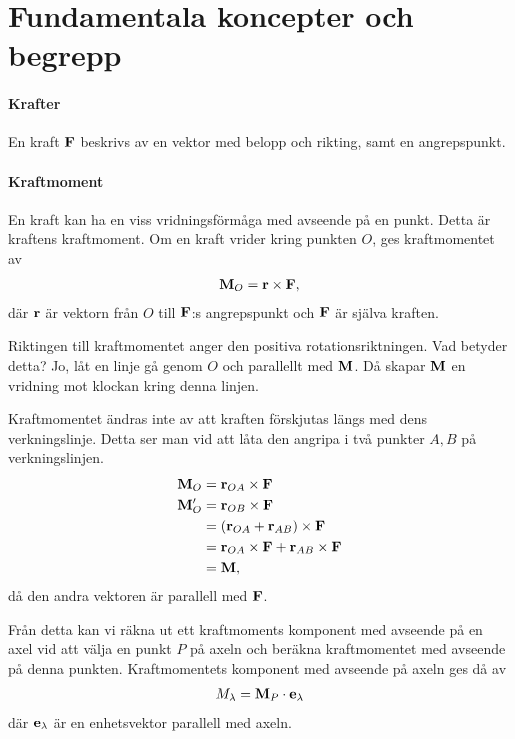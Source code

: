 \section{Fundamentala koncepter och begrepp}

\paragraph{Krafter}
En kraft $\vect{F}$ beskrivs av en vektor med belopp och rikting, samt en angrepspunkt.

\paragraph{Kraftmoment}
En kraft kan ha en viss vridningsförmåga med avseende på en punkt. Detta är kraftens kraftmoment. Om en kraft vrider kring punkten $O$, ges kraftmomentet av
\begin{align*}
	\vect{M}_O = \vect{r}\times\vect{F},
\end{align*}
där $\vect{r}$ är vektorn från $O$ till $\vect{F}$:s angrepspunkt och $\vect{F}$ är själva kraften.

Riktingen till kraftmomentet anger den positiva rotationsriktningen. Vad betyder detta? Jo, låt en linje gå genom $O$ och parallellt med $\vect{M}$. Då skapar $\vect{M}$ en vridning mot klockan kring denna linjen.

Kraftmomentet ändras inte av att kraften förskjutas längs med dens verkningslinje. Detta ser man vid att låta den angripa i två punkter $A, B$ på verkningslinjen.
\begin{align*}
	\vect{M}_O  &= \vect{r}_{OA}\times\vect{F} \\
	\vect{M}'_O &= \vect{r}_{OB}\times\vect{F} \\
	            &= (\vect{r}_{OA} + \vect{r}_{AB})\times\vect{F} \\
	            &= \vect{r}_{OA}\times\vect{F} + \vect{r}_{AB}\times\vect{F}\\
	            &= \vect{M},
\end{align*}
då den andra vektoren är parallell med $\vect{F}$.

Från detta kan vi räkna ut ett kraftmoments komponent med avseende på en axel vid att välja en punkt $P$ på axeln och beräkna kraftmomentet med avseende på denna punkten. Kraftmomentets komponent med avseende på axeln ges då av
\begin{align*}
	M_\lambda = \vect{M}_P\cdot\vect{e}_\lambda
\end{align*}
där $\vect{e}_\lambda$ är en enhetsvektor parallell med axeln.

